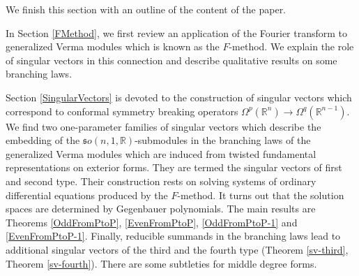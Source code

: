 \documentclass[a4paper,12pt,reqno]{amsart}
\numberwithin{theorem}{subsection}
\numberwithin{equation}{section}
\begin{document}
\vspace{3pt}

We finish this section with an outline of the content of the paper.

In Section \ref{FMethod}, we first review an application of the Fourier
transform to generalized Verma modules which is known as the $F$-method. We
explain the role of singular vectors in this connection and describe
qualitative results on some branching laws.

Section \ref{SingularVectors} is devoted to the construction of singular
vectors which correspond to conformal symmetry breaking operators
$\Omega^p({\mathbb{R}}^n) \to \Omega^q({\mathbb{R}}^{n-1})$. We find two one-parameter families of
singular vectors which describe the embedding of the ${{\mathfrak so}}(n,1,{\mathbb{R}})$-submodules
in the branching laws of the generalized Verma modules which are induced from
twisted fundamental representations on exterior forms. They are termed the
singular vectors of first and second type. Their construction rests on solving
systems of ordinary differential equations produced by the $F$-method. It turns
out that the solution spaces are determined by Gegenbauer polynomials. The main
results are Theorems \ref{OddFromPtoP}, \ref{EvenFromPtoP}, \ref{OddFromPtoP-1}
and \ref{EvenFromPtoP-1}. Finally, reducible summands in the branching laws
lead to additional singular vectors of the third and the fourth type (Theorem
\ref{sv-third}, Theorem \ref{sv-fourth}). There are some subtleties for middle
degree forms.
\end{document}
